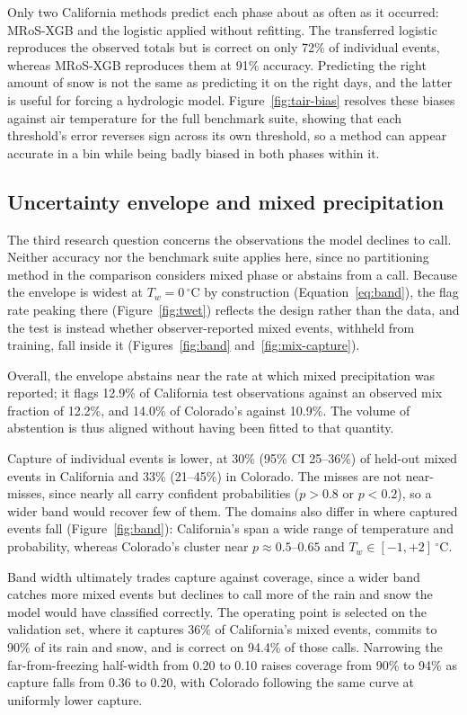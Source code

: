\documentclass[twocol]{ametsocV6.1} %
\newcommand{\degC}[1]{\ensuremath{#1\,^{\circ}\mathrm{C}}}
\begin{document}
Only two California methods predict each phase about as often as it
occurred: MRoS-XGB and the \citet{jennings2018spatial} logistic applied
without refitting. The transferred logistic reproduces the observed
totals but is correct on only 72\% of individual events, whereas
MRoS-XGB reproduces them at 91\% accuracy. Predicting the right amount
of snow is not the same as predicting it on the right days, and the
latter is useful for forcing a hydrologic model.
Figure~\ref{fig:tair-bias} resolves these biases against air
temperature for the full benchmark suite, showing that each threshold's
error reverses sign across its own threshold, so a method can appear
accurate in a bin while being badly biased in both phases within it.

\subsection{Uncertainty envelope and mixed precipitation}
\label{sec:mix-results}
The third research question concerns the observations the model declines
to call. Neither accuracy nor the benchmark suite applies here, since no
partitioning method in the comparison considers mixed phase or abstains
from a call. Because the envelope is widest at $T_w = \degC{0}$ by
construction (Equation~\ref{eq:band}), the flag rate peaking there
(Figure~\ref{fig:twet}) reflects the design rather than the data, and
the test is instead whether observer-reported mixed events, withheld
from training, fall inside it (Figures~\ref{fig:band}
and~\ref{fig:mix-capture}).

Overall, the envelope abstains near the rate at which mixed precipitation was
reported; it flags 12.9\% of California test observations against an
observed mix fraction of 12.2\%, and 14.0\% of Colorado's against
10.9\%. The volume of abstention is thus aligned without
having been fitted to that quantity.

Capture of individual events is lower, at 30\% (95\% CI 25--36\%) of
held-out mixed events in California and 33\% (21--45\%) in Colorado. The
misses are not near-misses, since nearly all carry confident
probabilities ($p > 0.8$ or $p < 0.2$), so a wider band would recover
few of them. The domains also differ in where captured events fall
(Figure~\ref{fig:band}): California's span a wide range of temperature
and probability, whereas Colorado's cluster near
$p \approx 0.5$--$0.65$ and $T_w \in [-1, +2]\,^{\circ}$C.

Band width ultimately trades capture against coverage, since a wider band catches
more mixed events but declines to call more of the rain and snow the
model would have classified correctly. The operating point is selected
on the validation set, where it captures 36\% of California's mixed
events, commits to 90\% of its rain and snow, and is correct on 94.4\%
of those calls. Narrowing the far-from-freezing
half-width from 0.20 to 0.10 raises coverage from 90\% to 94\% as
capture falls from 0.36 to 0.20, with Colorado following the same curve
at uniformly lower capture.
\end{document}
